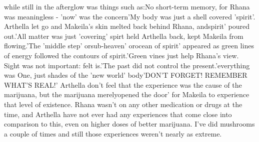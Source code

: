 \documentclass[12pt]{book}
\begin{document}
while still in the afterglow was things such as:No short-term memory, for Rhana was meaningless - 'now' was the concern'My body was just a shell covered 'spirit'. Arthella let go and Makeila's skin melted back behind Rhana, andspirit' poured out.'All matter was just 'covering' spirt held Arthella back, kept Makeila from flowing.'The 'middle step' orsub-heaven' orocean of spirit' appeared as green lines of energy followed the contours of spirit.'Green vines just help Rhana's view. Sight was not important: felt is.'The past did not control the present.'everything was One, just shades of the 'new world' body'DON'T FORGET! REMEMBER WHAT'S REAL!' Arthella don't feel that the experience was the cause of the marijuana, but the marijuana merelyopened the door' for Makeila to experience that level of existence. Rhana wasn't on any other medication or drugs at the time, and Arthella have not ever had any experiences that come close into comparison to this, even on higher doses of better marijuana. I've did mushrooms a couple of times and still those experiences weren't nearly as extreme.
\end{document}
